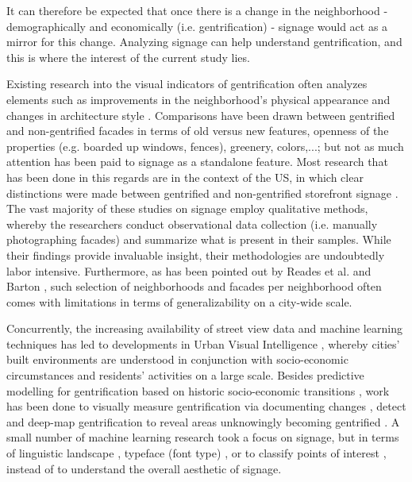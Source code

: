 It can therefore be expected that once there is a change in the neighborhood - demographically and economically (i.e. gentrification) - signage would act as a mirror for this change. Analyzing signage can help understand gentrification, and this is where the interest of the current study lies.

Existing research into the visual indicators of gentrification often analyzes elements such as improvements in the neighborhood's physical appearance and changes in architecture style \cite{huang_detecting_2022, ravuri_gsv_2022, naik_computer_2017, ilic_deepmap_2019}. Comparisons have been drawn between gentrified and non-gentrified facades in terms of old versus new features, openness of the properties (e.g. boarded up windows, fences), greenery, colors,...; but not as much attention has been paid to signage as a standalone feature. Most research that has been done in this regards are in the context of the US, in which clear distinctions were made between gentrified and non-gentrified storefront signage \cite{trinch_signsays_2017, snajdr_oldschool_2018, snajdr_preserve_2022, rahman_signage_2020}. The vast majority of these studies on signage employ qualitative methods, whereby the researchers conduct observational data collection (i.e. manually photographing facades) and summarize what is present in their samples. While their findings provide invaluable insight, their methodologies are undoubtedly labor intensive. Furthermore, as has been pointed out by Reades et al. \cite{reades_understanding_2019} and Barton \cite{barton_exploration_2016}, such selection of neighborhoods and facades per neighborhood often comes with limitations in terms of generalizability on a city-wide scale.

Concurrently, the increasing availability of street view data and machine learning techniques has led to developments in Urban Visual Intelligence \cite{zhanga_urban_2023}, whereby cities' built environments are understood in conjunction with socio-economic circumstances and residents' activities on a large scale. Besides predictive modelling for gentrification based on historic socio-economic transitions \cite{thackway_build_2021, reades_understanding_2019}, work has been done to visually measure gentrification via documenting changes \cite{ravuri_gsv_2022}, detect \cite{huang_detecting_2022} and deep-map gentrification to reveal areas unknowingly becoming gentrified \cite{ilic_deepmap_2019}. A small number of machine learning research took a focus on signage, but in terms of linguistic landscape \cite{hong_linguistic_2020, thung_detecting_2022}, typeface (font type) \cite{ma_typef_2019}, or to classify points of interest \cite{noorian_detect_2020, bakaev_stsem_2019}, instead of to understand the overall aesthetic of signage.

